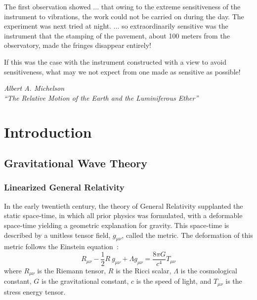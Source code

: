 \documentclass [12pt, proquest]{uwthesis}[2019]
\begin{document}
\textpages
\epigraph{The first observation showed ... that owing to the extreme sensitiveness of the instrument to vibrations, the work could not be carried on during the day. The experiment was next tried at night. ... so extraordinarily sensitive was the instrument that the stamping of the pavement, about 100 meters from the observatory, made the fringes disappear entirely!

If this was the case with the instrument constructed with a view to avoid sensitiveness, what may we not expect from one made as sensitive as possible!}{\textit{Albert A. Michelson \\``The Relative Motion of the Earth and the Luminiferous Ether''}}
\chapter{Introduction}
\section{Gravitational Wave Theory}

\subsection{Linearized General Relativity}

In the early twentieth century, the theory of General Relativity supplanted the static space-time, in which all prior physics was formulated, with a deformable space-time yielding a geometric explanation for gravity. This space-time is described by a unitless tensor field, $g_{\mu \nu}$, called the metric. The deformation of this metric follows the Einstein equation~\cite{einsteinGR}:
\begin{equation}
R_{\mu \nu}-\frac{1}{2}R\ g_{\mu \nu}+\Lambda g_{\mu \nu}= \frac{8\pi G}{c^4} T_{\mu \nu}
\end{equation}
where $R_{\mu \nu}$ is the Riemann tensor, $R$ is the Ricci scalar, $\Lambda$ is the cosmological constant, $G$ is the gravitational constant, $c$ is the speed of light, and $T_{\mu \nu}$ is the stress energy tensor.
\end{document}
